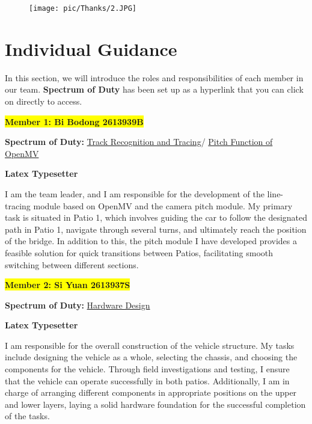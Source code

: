 \documentclass[12pt, a4paper, oneside]{report}
\begin{document}
\begin{figure}[H]
  \centering
  \texttt{[image: pic/Thanks/2.JPG]}
  \label{fig:team02-2}
\end{figure}

\newpage
\section*{Individual Guidance}
In this section, we will introduce the roles and responsibilities of each member in our team. \textbf{Spectrum of Duty} has been set up as a hyperlink that you can click on directly to access.
\vspace{\baselineskip}

\colorbox{yellow}{\textbf{Member 1: Bi Bodong 2613939B} }
\begin{tcolorbox}
\textbf{Spectrum of Duty:} 
\hyperref[sec:Tracing]{\textcolor{mybg}{Track Recognition and Tracing}}/
\hyperref[sec:Pitch]{\textcolor{mybg}{Pitch Function of OpenMV}}

\textbf{Latex Typesetter}
\end{tcolorbox}

I am the team leader, and I am responsible for the development of the line-tracing module based on OpenMV and the camera pitch module. My primary task is situated in Patio 1, which involves guiding the car to follow the designated path in Patio 1, navigate through several turns, and ultimately reach the position of the bridge. In addition to this, the pitch module I have developed provides a feasible solution for quick transitions between Patios, facilitating smooth switching between different sections.
\vspace{\baselineskip}

\colorbox{yellow}{\textbf{Member 2: Si Yuan 2613937S} }
\begin{tcolorbox}
\textbf{Spectrum of Duty:} 
\hyperref[sec:Hardware]{\textcolor{mybg}{Hardware Design}}

\textbf{Latex Typesetter}
\end{tcolorbox}

I am responsible for the overall construction of the vehicle structure. My tasks include designing the vehicle as a whole, selecting the chassis, and choosing the components for the vehicle. Through field investigations and testing, I ensure that the vehicle can operate successfully in both patios. Additionally, I am in charge of arranging different components in appropriate positions on the upper and lower layers, laying a solid hardware foundation for the successful completion of the tasks.
\end{document}
